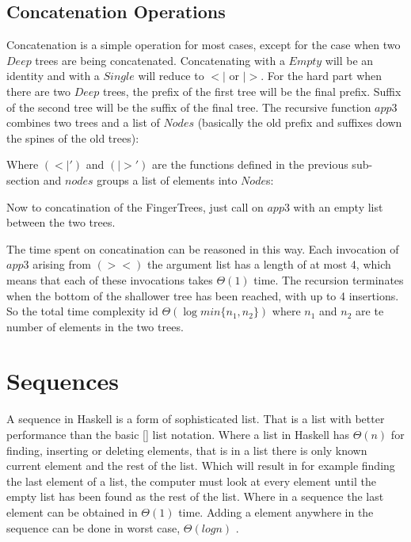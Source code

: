 \subsection{Concatenation Operations}
Concatenation is a simple operation for most cases, except for the case when two $Deep$ trees are being concatenated. Concatenating with a $Empty$ will be an identity and with a $Single$ will reduce to $<|$ or $|>$. For the hard part when there are two $Deep$ trees, the prefix of the first tree will be the final prefix. Suffix of the second tree will be the suffix of the final tree. The recursive function $app3$ combines two trees and a list of $Nodes$ (basically the old prefix and suffixes down the spines of the old trees):



Where $(<|')$ and $(|>')$ are the functions defined in the previous sub-section and $nodes$ groups a list of elements into $Node$s: 



Now to concatination of the FingerTrees, just call on $app3$ with an empty list between the two trees.



The time spent on concatination can be reasoned in this way. Each invocation of $app3$ arising from $(><)$ the argument list has a length of at most 4, which means that each of these invocations takes $\Theta(1)$ time. The recursion terminates when the bottom of the shallower tree has been reached, with up to 4 insertions. So the total time complexity id $\Theta(\log min\{n_1, n_2\})$ where $n_1$ and $n_2$ are te number of elements in the two trees. 

\section{Sequences}
A sequence in Haskell is a form of sophisticated list. That is a list with better performance than the basic [] list notation. Where a list in Haskell has $\Theta(n)$ for finding, inserting or deleting elements, that is in a list there is only known current element and the rest of the list. Which will result in for example finding the last element of a list, the computer must look at every element until the empty list has been found as the rest of the list. Where in a sequence the last element can be obtained in $\Theta(1)$ time. Adding a element anywhere in the sequence can be done in worst case, $\Theta(log n)$ \cite{fingertree}. 


